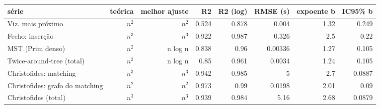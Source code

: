 \begin{tabular}{lrrrrrrr}
\hline
série & teórica & melhor ajuste & R2 & R2 (log) & RMSE (s) & expoente b & IC95\% b \\
\hline
Viz. mais próximo & $n^{2}$ & $n^{2}$ & 0.524 & 0.878 & 0.004 & 1.32 & 0.249 \\
Fecho: inserção & $n^{3}$ & $n^{3}$ & 0.922 & 0.987 & 0.326 & 2.5 & 0.22 \\
MST (Prim denso) & $n^{2}$ & n log n & 0.838 & 0.96 & 0.00336 & 1.27 & 0.105 \\
Twice-around-tree (total) & $n^{2}$ & n log n & 0.85 & 0.961 & 0.0034 & 1.24 & 0.105 \\
Christofides: matching & $n^{3}$ & $n^{3}$ & 0.942 & 0.985 & 5 & 2.7 & 0.0887 \\
Christofides: grafo do matching & $n^{2}$ & $n^{2}$ & 0.973 & 0.99 & 0.0198 & 2.01 & 0.09 \\
Christofides (total) & $n^{3}$ & $n^{3}$ & 0.939 & 0.984 & 5.16 & 2.68 & 0.0879 \\
\hline
\end{tabular}
